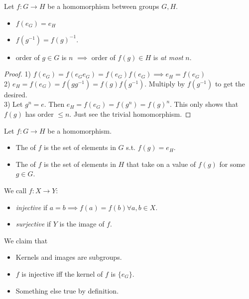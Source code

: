 \documentclass{scrartcl}
\begin{document}
\begin{proposition}
	Let $f:G \rightarrow H$ be a homomorphism between groups $G,H$. 
	\begin{itemize}
		\item $f(e_G) = e_H$
		\item $f(g^{-1}) = f(g)^{-1}$.
		\item order of $g \in G$ is $n$ $\implies$ order of $f(g) \in H$ is \textit{at most} $n$.
	\end{itemize}
\end{proposition}
\begin{proof}
	1) $f(e_G) = f(e_Ge_G) = f(e_G)f(e_G) \implies e_H = f(e_G)$ \\
	2) $e_H = f(e_G) = f(gg^{-1}) = f(g)f(g^{-1})$. Multiply by $f(g^{-1})$ to get the desired. \\
	3) Let $g^n = e$. Then $e_H = f(e_G) = f(g^n) = f(g)^n$. This only shows that $f(g)$ has order $\le n$. Just see the trivial homomorphism.
\end{proof}

\begin{definition}
	Let $f : G \rightarrow H$ be a homomorphism.
	\begin{itemize}
		\item The  of $f$ is the set of elements in $G$ s.t. $f(g) = e_H$.
		\item The  of $f$ is the set of elements in $H$ that take on a value of $f(g)$ for some $g \in G$.
	\end{itemize}
\end{definition}

\begin{definition}
We call $f:X \rightarrow Y$:
\begin{itemize}
	\item \textit{injective} if $a=b \implies f(a)=f(b) \forall a,b \in X$.
	\item \textit{surjective} if $Y$ is the image of $f$.
\end{itemize}
\end{definition}

\begin{proposition}
	We claim that
	\begin{itemize}
		\item Kernels and images are subgroups.
		\item $f$ is injective iff the kernel of $f$ is $\{e_G\}$.
		\item Something else true by definition.
	\end{itemize}
\end{proposition}
\end{document}
